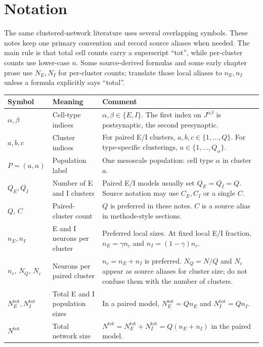\chapter{Notation}

The same clustered-network literature uses several overlapping symbols. These
notes keep one primary convention and record source aliases when needed. The
main rule is that total cell counts carry a superscript ``tot'', while
per-cluster counts use lower-case \(n\). Some source-derived formulas and some
early chapter prose use \(N_E,N_I\) for per-cluster counts; translate those
local aliases to \(n_E,n_I\) unless a formula explicitly says ``total''.

\begin{longtable}{@{}p{}p{}p{}@{}}
\toprule
\textbf{Symbol} & \textbf{Meaning} & \textbf{Comment} \\
\midrule
\endhead
\(\alpha,\beta\) & Cell-type indices & \(\alpha,\beta\in\{E,I\}\). The first index on \(J^{\alpha\beta}\) is postsynaptic, the second presynaptic. \\
\(a,b,c\) & Cluster indices & For paired E/I clusters, \(a,b,c\in\{1,\ldots,Q\}\). For type-specific clusterings, \(a\in\{1,\ldots,Q_\alpha\}\). \\
\(P=(a,\alpha)\) & Population label & One mesoscale population: cell type \(\alpha\) in cluster \(a\). \\
\(Q_E,Q_I\) & Number of E and I clusters & Paired E/I models usually set \(Q_E=Q_I=Q\). Source notation may use \(C_E,C_I\) or a single \(C\). \\
\(Q\), \(C\) & Paired-cluster count & \(Q\) is preferred in these notes. \(C\) is a source alias in methods-style sections. \\
\(n_E,n_I\) & E and I neurons per cluster & Preferred local sizes. At fixed local E/I fraction, \(n_E=\gamma n_c\) and \(n_I=(1-\gamma)n_c\). \\
\(n_c\), \(N_Q\), \(N_c\) & Neurons per paired cluster & \(n_c=n_E+n_I\) is preferred. \(N_Q=N/Q\) and \(N_c\) appear as source aliases for cluster size; do not confuse them with the number of clusters. \\
\(N_E^{\mathrm{tot}},N_I^{\mathrm{tot}}\) & Total E and I population sizes & In a paired model, \(N_E^{\mathrm{tot}}=Q n_E\) and \(N_I^{\mathrm{tot}}=Q n_I\). \\
\(N^{\mathrm{tot}}\) & Total network size & \(N^{\mathrm{tot}}=N_E^{\mathrm{tot}}+N_I^{\mathrm{tot}}=Q(n_E+n_I)\) in the paired model. \\

\end{longtable}
